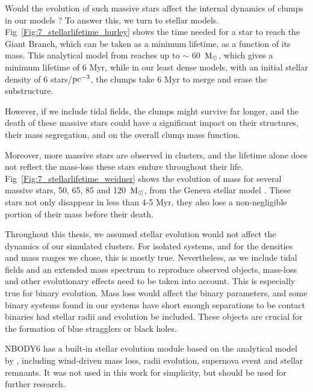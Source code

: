 Would the evolution of such massive stars affect the internal dynamics of clumps in our models ? To answer this, we turn to stellar models. Fig~\ref{Fig:7_stellarlifetime_hurley} shows the time needed for a star to reach the Giant Branch, which can be taken as a minimum lifetime, as a function of its mass. This analytical model from \cite{Hurley2000} reaches up to $\sim$ 60~${\textrm{M}_\odot}$, which gives a minimum lifetime of 6 Myr, while in our least dense models, with an initial stellar density of 6 stars/${\textrm{pc}}^{-3}$, the clumps take 6 Myr to merge and erase the substructure.

However, if we include tidal fields, the clumps might survive far longer, and the death of these massive stars could have a significant impact on their structures, their mass segregation, and  on the overall clump mass function.

Moreover, more massive stars are observed in clusters, and the lifetime alone does not reflect the mass-loss these stars endure throughout their life. Fig~\ref{Fig:7_stellarlifetime_weidner} shows the evolution of mass for several massive stars, 50, 65, 85 and 120~${\textrm{M}_\odot}$, from the Geneva stellar model \cite{Schaller1992}. These stars not only disappear in less than 4-5 Myr, they also lose a non-negligible portion of their mass before their death.

Throughout this thesis, we assumed stellar evolution would not affect the dynamics of our simulated clusters. For isolated systems, and for the densities and mass ranges we chose, this is mostly true. Nevertheless, as we include tidal fields and an extended mass spectrum to reproduce observed objects, mass-loss and other evolutionary effects need to be taken into account. This is especially true for binary evolution. Mass loss would affect the binary parameters, and some binary systems found in our systems have short enough separations to be contact binaries had stellar radii and evolution be included. These objects are crucial for the formation of blue stragglers or black holes.

NBODY6 has a built-in stellar evolution module based on the analytical model by \cite{Hurley2000}, including wind-driven mass loss, radii evolution, supernova event and stellar remnants. It was not used in this work for simplicity, but should be used for further research.



